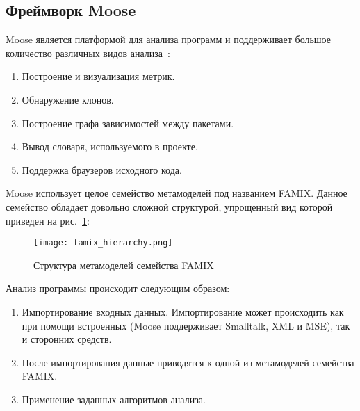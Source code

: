 \subsection{Фреймворк Moose}

Moose является платформой для анализа программ и поддерживает большое количество
различных видов анализа~\cite{moose}:

\begin{enumerate}
    \item Построение и визуализация метрик.
    \item Обнаружение клонов.
    \item Построение графа зависимостей между пакетами.
    \item Вывод словаря, используемого в проекте.
    \item Поддержка браузеров исходного кода.
\end{enumerate}


Moose использует целое семейство метамоделей под названием FAMIX. Данное
семейство обладает довольно сложной структурой, упрощенный вид которой приведен
на рис.~\ref{fig:famix_hierarchy}:

\newpage
\begin{figure}[ht!]
     \begin{center}
         \texttt{[image: famix\_hierarchy.png]}
     \end{center}
     \caption{Структура метамоделей семейства FAMIX}
     \label{fig:famix_hierarchy}
\end{figure}

Анализ программы происходит следующим образом:

\begin{enumerate}
    \item Импортирование входных данных. Импортирование может происходить как
    при помощи встроенных (Moose поддерживает Smalltalk, XML и MSE), так и
    сторонних средств.
    \item После импортирования данные приводятся к одной из метамоделей
    семейства FAMIX.
    \item Применение заданных алгоритмов анализа.
\end{enumerate}

